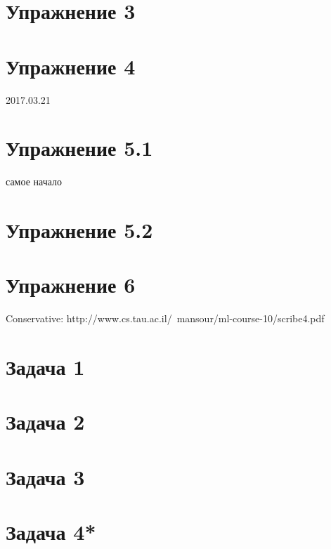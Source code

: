 \documentclass[a4paper]{article}
\begin{document}
\section*{Упражнение 3}
\section*{Упражнение 4}
2017.03.21
\section*{Упражнение 5.1}
самое начало
\section*{Упражнение 5.2}
\section*{Упражнение 6}
Conservative: http://www.cs.tau.ac.il/~mansour/ml-course-10/scribe4.pdf
\section*{Задача 1}
\section*{Задача 2}
\section*{Задача 3}
\section*{Задача 4*}
\end{document}
